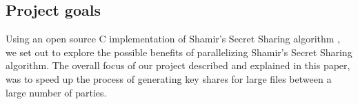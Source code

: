 \documentclass[main.tex]{subfiles}
\begin{document}

\subsection{Project goals}

\indent Using an open source C implementation of Shamir's Secret Sharing algorithm \cite{one}, we set out to explore the possible benefits of parallelizing Shamir's Secret Sharing algorithm.  The overall focus of our project described and explained in this paper, was to speed up the process of generating key shares for large files between a large number of parties.

\end{document}
